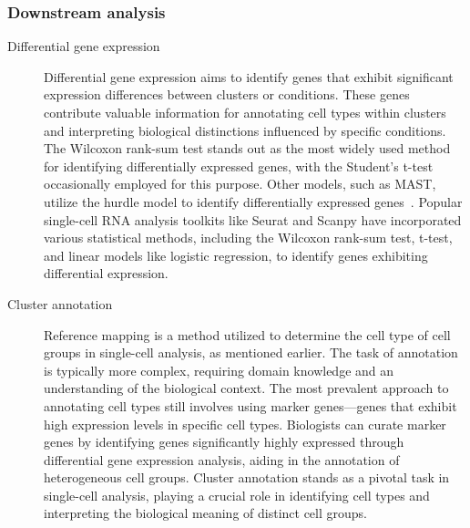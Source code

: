 \subsubsection{Downstream analysis}
\begin{description}
	\item[Differential gene expression] 
	Differential gene expression aims to identify genes that exhibit significant expression differences between clusters or conditions. These genes contribute valuable information for annotating cell types within clusters and interpreting biological distinctions influenced by specific conditions. The Wilcoxon rank-sum test stands out as the most widely used method for identifying differentially expressed genes, with the Student's t-test occasionally employed for this purpose. Other models, such as MAST, utilize the hurdle model to identify differentially expressed genes~\citep{finak2015mast}. Popular single-cell RNA analysis toolkits like Seurat and Scanpy have incorporated various statistical methods, including the Wilcoxon rank-sum test, t-test, and linear models like logistic regression, to identify genes exhibiting differential expression.

	\item[Cluster annotation]
	Reference mapping is a method utilized to determine the cell type of cell groups in single-cell analysis, as mentioned earlier. The task of annotation is typically more complex, requiring domain knowledge and an understanding of the biological context. The most prevalent approach to annotating cell types still involves using marker genes—genes that exhibit high expression levels in specific cell types. Biologists can curate marker genes by identifying genes significantly highly expressed through differential gene expression analysis, aiding in the annotation of heterogeneous cell groups. Cluster annotation stands as a pivotal task in single-cell analysis, playing a crucial role in identifying cell types and interpreting the biological meaning of distinct cell groups.


\end{description}
